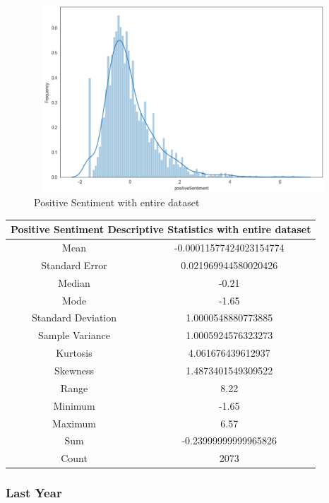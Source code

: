\begin{figure}[h!]
\centering
\includegraphics[width=15cm,height=7cm,keepaspectratio]{resultsEvaluation/positiveDescMax.png}
\caption{Positive Sentiment with entire dataset}
\label{fig:appendix_positiveDescMax}
\end{figure}
\begin{center}
\begin{tabular}{ c c }
\hline
\multicolumn{2}{|c|}{Positive Sentiment Descriptive Statistics with entire dataset} \\
\hline
Mean & -0.00011577424023154774 \\
Standard Error & 0.021969944580020426 \\
Median & -0.21 \\
Mode & -1.65 \\
Standard Deviation & 1.0000548880773885 \\
Sample Variance & 1.0005924576323273 \\
Kurtosis & 4.061676439612937 \\
Skewness & 1.4873401549309522 \\
Range & 8.22 \\
Minimum & -1.65 \\
Maximum & 6.57 \\
Sum & -0.23999999999965826 \\
Count & 2073
\end{tabular}
\end{center}

\subsubsection{Last Year}


